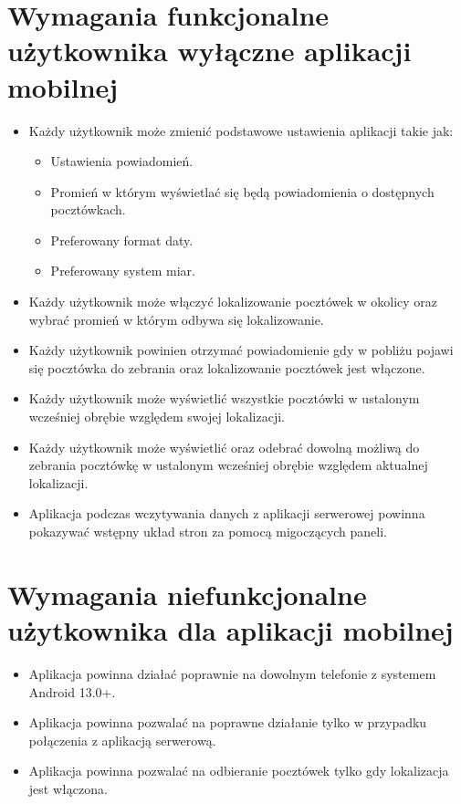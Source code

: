 \documentclass[a4paper,twoside,12pt]{book}
\begin{document}
\section{Wymagania funkcjonalne użytkownika wyłączne aplikacji mobilnej}
\begin{itemize}
    \item Każdy użytkownik może zmienić podstawowe ustawienia aplikacji takie jak:
    \begin{itemize}
        \item Ustawienia powiadomień.
        \item Promień w którym wyświetlać się będą powiadomienia o dostępnych pocztówkach.
        \item Preferowany format daty.
        \item Preferowany system miar.
    \end{itemize}
    \item Każdy użytkownik może włączyć lokalizowanie pocztówek w okolicy oraz wybrać promień w którym odbywa się lokalizowanie.
    \item Każdy użytkownik powinien otrzymać powiadomienie gdy w pobliżu pojawi się pocztówka do zebrania oraz lokalizowanie pocztówek jest włączone.
    \item Każdy użytkownik może wyświetlić wszystkie pocztówki w ustalonym wcześniej obrębie względem swojej lokalizacji.
    \item Każdy użytkownik może wyświetlić oraz odebrać dowolną możliwą do zebrania pocztówkę w ustalonym wcześniej obrębie względem aktualnej lokalizacji.
    \item Aplikacja podczas wczytywania danych z aplikacji serwerowej powinna pokazywać wstępny układ stron za pomocą migoczących paneli.
\end{itemize}

\section{Wymagania niefunkcjonalne użytkownika dla aplikacji mobilnej}
\begin{itemize}
    \item Aplikacja powinna działać poprawnie na dowolnym telefonie z systemem Android 13.0+.
    \item Aplikacja powinna pozwalać na poprawne działanie tylko w przypadku połączenia z aplikacją serwerową.
    \item Aplikacja powinna pozwalać na odbieranie pocztówek tylko gdy lokalizacja jest włączona.
\end{itemize}
\end{document}

